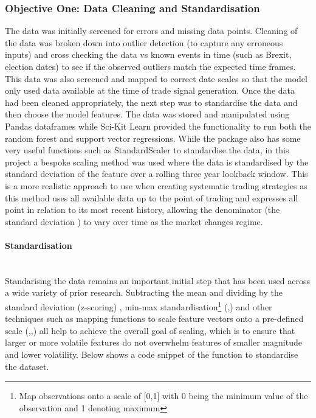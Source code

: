 \documentclass[11pt]{article}
\newcommand{\myparagraph}[1]{\paragraph{#1}\mbox{}\\}
\begin{document}
\subsubsection{Objective One: Data Cleaning and Standardisation}
The data was initially screened for errors and missing data points. Cleaning of the data was broken down into outlier detection (to capture any erroneous inputs) and cross checking the data vs known events in time (such as Brexit, election dates) to see if the observed outliers match the expected time frames. This data was also screened and mapped to correct date scales so that the model only used data available at the time of trade signal generation. Once the data had been cleaned appropriately, the next step was to standardise the data and then choose the model features.
 The data was stored and manipulated using Pandas dataframes while Sci-Kit Learn provided the functionality to run both the random forest and support vector regressions. While the package also has some very useful functions such as StandardScaler to standardise the data, in this project a bespoke scaling method was used where the data is standardised by the standard deviation of the feature over a rolling three year lookback window. This is a more realistic approach to use when creating systematic trading strategies as this method uses all available data up to the point of trading and expresses all point in relation to its most recent history, allowing the denominator (the standard deviation ) to vary over time as the market changes regime.
\myparagraph{Standardisation}
Standarising the data remains an important initial step that has been used across a wide variety of prior research. Subtracting the mean and dividing by the standard deviation (z-scoring) \cite{Fischer2018}, min-max standardisation\footnote{Map observations onto a scale of [0,1] with 0 being the minimum value of the observation and 1 denoting maximum} (\cite{Gunduz2017},\cite{Kumar2006})  and other techniques such as  mapping functions to scale feature vectors onto a pre-defined scale (\cite{Kara2011},\cite{Wang2014},\cite{Patel2015}) all help to achieve the overall goal of scaling, which is to ensure that larger or more volatile features do not overwhelm features of smaller magnitude and lower volatility.  Below shows a code snippet of the function to standardise the dataset.
\end{document}
